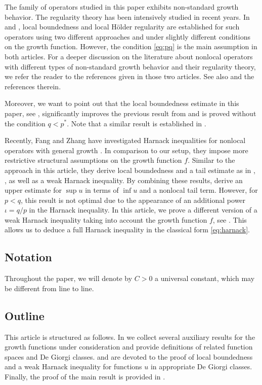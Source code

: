 \documentclass[11pt]{amsart}
\theoremstyle{plain}
\theoremstyle{definition}
\numberwithin{equation}{section}
\begin{document}
The family of operators studied in this paper exhibits non-standard growth behavior. 
The regularity theory has been intensively studied in recent years. 
In \cite{ChKiWe21} and \cite{ByKiOk21}, local boundedness and local H\"older regularity are established for such operators using two different approaches and under slightly different conditions on the growth function. However, the condition \eqref{eq:pq} is the main assumption in both articles. For a deeper discussion on the literature about nonlocal operators with different types of non-standard growth behavior and their regularity theory, we refer the reader to the references given in those two articles. 
See also \cite{DePa19, GoDeSr20, BoSaVi20, ChKi21, Ok21, GiKuSr21b, ByOkSo21, FaZh21, GiKuSr22a} and the references therein.

Moreover, we want to point out that the local boundedness estimate in this paper, see , significantly improves the previous result from \cite{ChKiWe21} and is proved without the condition $q<p^{\ast}$. Note that a similar result is established in \cite{ByKiOk21}.

Recently, Fang and Zhang have investigated Harnack inequalities for nonlocal operators with general growth \cite{FaZh22}. In comparison to our setup, they impose more restrictive structural assumptions on the growth function $f$. Similar to the approach in this article, they derive local boundedness and a tail estimate as in , , as well as a weak Harnack inequality. By combining these results, \cite{FaZh22} derive an upper estimate for $\sup u$ in terms of $\inf u$ and a nonlocal tail term. However, for $p < q$, this result is not optimal due to the appearance of an additional power $\iota = q/p$ in the Harnack inequality. In this article, we prove a different version of a weak Harnack inequality taking into account the growth function $f$, see . This allows us to deduce a full Harnack inequality in the classical form \eqref{eq:harnack}.



\subsection*{Notation}
Throughout the paper, we will denote by $C > 0$ a universal constant, which may be different from line to line.

\subsection*{Outline}
This article is structured as follows. In  we collect several auxiliary results for the growth functions under consideration and provide definitions of related function spaces and De Giorgi classes.  and  are devoted to the proof of local boundedness and a weak Harnack inequality for functions $u$ in appropriate De Giorgi classes. Finally, the proof of the main result  is provided in .
\end{document}
